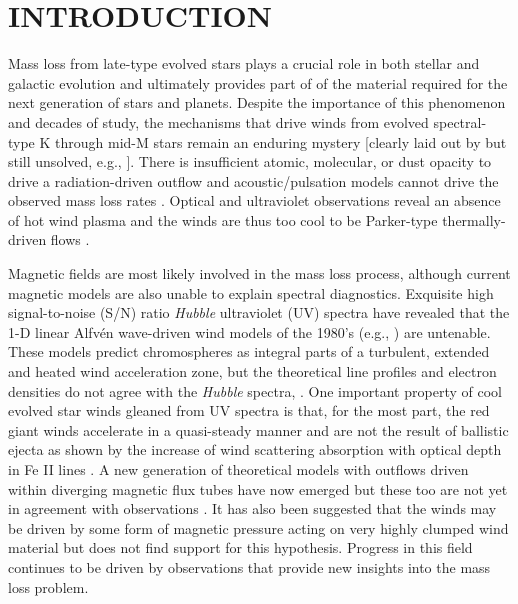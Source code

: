 \documentclass[iop]{emulateapj}
\begin{document}

\section{INTRODUCTION}

Mass loss from late-type evolved stars plays a crucial role in both stellar and galactic evolution and ultimately provides part of of the material required for the next generation of stars and planets. Despite the importance of this phenomenon and decades of study, the mechanisms that drive winds from evolved spectral-type K through mid-M stars remain an enduring mystery [clearly laid out by \cite{1985ASSL..117..229H} but still unsolved, e.g., \cite{2009AIPC.1094..267C}]. There is insufficient atomic, molecular, or dust opacity to drive a radiation-driven outflow and acoustic/pulsation models cannot drive the observed mass loss rates \citep{1995ApJ...442L..61S}. Optical and ultraviolet observations reveal an absence of hot wind plasma and the winds are thus too cool to be Parker-type thermally-driven flows \cite[e.g.,][]{1979ApJ...229L..27L,1981ApJ...250..293A}. 

Magnetic fields are most likely involved in the mass loss process, although current magnetic models are also unable to explain spectral diagnostics. Exquisite high signal-to-noise (S/N) ratio \textit{Hubble} ultraviolet (UV) spectra have revealed that the 1-D linear Alfv\'en wave-driven wind models of the 1980’s (e.g., \citealt{1980ApJ...242..260H,1988PhDT........13H}) are untenable. These models predict chromospheres as integral parts of a turbulent, extended and heated wind acceleration zone, but the theoretical line profiles and electron densities do not agree with the \textit{Hubble} spectra, \cite[e.g.,][]{1998ApJ...494..828J}. One important property of cool evolved star winds gleaned from UV spectra is that, for the most part, the red giant winds accelerate in a quasi-steady manner and are not the result of ballistic ejecta as shown by the increase of wind scattering absorption with optical depth in Fe II lines \citep{1999ApJ...521..382C}. A new generation of theoretical models with outflows driven within diverging magnetic flux tubes have now emerged \citep{2006MNRAS.368.1145F, 2007ApJ...659.1592S} but these too are not yet in agreement with observations \citep{2009AIPC.1094..267C}. It has also been suggested that the winds may be driven by some form of magnetic pressure acting on very highly clumped wind material \citep{2008AJ....136.1964E} but \cite{2010ApJ...720.1767H} does not find support for this hypothesis. Progress in this field continues to be driven by observations that provide new insights into the mass loss problem.
\end{document}
